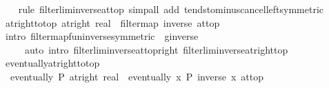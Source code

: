 \begin{isabellebody}
\ \ \isamarkupfalse%
\ {\isacharparenleft}{\kern0pt}rule\ filterlim{\isacharunderscore}{\kern0pt}inverse{\isacharunderscore}{\kern0pt}at{\isacharunderscore}{\kern0pt}top{\isacharparenright}{\kern0pt}\ {\isacharparenleft}{\kern0pt}simp{\isacharunderscore}{\kern0pt}all\ add{\isacharcolon}{\kern0pt}\ tendsto{\isacharunderscore}{\kern0pt}minus{\isacharunderscore}{\kern0pt}cancel{\isacharunderscore}{\kern0pt}left{\isacharbrackleft}{\kern0pt}symmetric{\isacharbrackright}{\kern0pt}{\isacharparenright}{\kern0pt}%
\endisatagproof
{\isafoldproof}%
%
\isadelimproof
\isanewline
%
\endisadelimproof
\isanewline
{}\isamarkupfalse%
\ at{\isacharunderscore}{\kern0pt}right{\isacharunderscore}{\kern0pt}to{\isacharunderscore}{\kern0pt}top{\isacharcolon}{\kern0pt}\ {\isachardoublequoteopen}{\isacharparenleft}{\kern0pt}at{\isacharunderscore}{\kern0pt}right\ {\isacharparenleft}{\kern0pt}{}{\isacharcolon}{\kern0pt}{\isacharcolon}{\kern0pt}real{\isacharparenright}{\kern0pt}{\isacharparenright}{\kern0pt}\ {\isacharequal}{\kern0pt}\ filtermap\ inverse\ at{\isacharunderscore}{\kern0pt}top{\isachardoublequoteclose}\isanewline
%
\isadelimproof
\ \ %
\endisadelimproof
%
\isatagproof
{}\isamarkupfalse%
\ {\isacharparenleft}{\kern0pt}intro\ filtermap{\isacharunderscore}{\kern0pt}fun{\isacharunderscore}{\kern0pt}inverse{\isacharbrackleft}{\kern0pt}symmetric{\isacharcomma}{\kern0pt}\ \ g{\isacharequal}{\kern0pt}inverse{\isacharbrackright}{\kern0pt}{\isacharparenright}{\kern0pt}\isanewline
\ \ \ \ \ {\isacharparenleft}{\kern0pt}auto\ intro{\isacharcolon}{\kern0pt}\ filterlim{\isacharunderscore}{\kern0pt}inverse{\isacharunderscore}{\kern0pt}at{\isacharunderscore}{\kern0pt}top{\isacharunderscore}{\kern0pt}right\ filterlim{\isacharunderscore}{\kern0pt}inverse{\isacharunderscore}{\kern0pt}at{\isacharunderscore}{\kern0pt}right{\isacharunderscore}{\kern0pt}top{\isacharparenright}{\kern0pt}%
\endisatagproof
{\isafoldproof}%
%
\isadelimproof
\isanewline
%
\endisadelimproof
\isanewline
{}\isamarkupfalse%
\ eventually{\isacharunderscore}{\kern0pt}at{\isacharunderscore}{\kern0pt}right{\isacharunderscore}{\kern0pt}to{\isacharunderscore}{\kern0pt}top{\isacharcolon}{\kern0pt}\isanewline
\ \ {\isachardoublequoteopen}eventually\ P\ {\isacharparenleft}{\kern0pt}at{\isacharunderscore}{\kern0pt}right\ {\isacharparenleft}{\kern0pt}{}{\isacharcolon}{\kern0pt}{\isacharcolon}{\kern0pt}real{\isacharparenright}{\kern0pt}{\isacharparenright}{\kern0pt}\ {\isasymlongleftrightarrow}\ eventually\ {\isacharparenleft}{\kern0pt}{\isasymlambda}x{\isachardot}{\kern0pt}\ P\ {\isacharparenleft}{\kern0pt}inverse\ x{\isacharparenright}{\kern0pt}{\isacharparenright}{\kern0pt}\ at{\isacharunderscore}{\kern0pt}top{\isachardoublequoteclose}\isanewline

\end{isabellebody}
